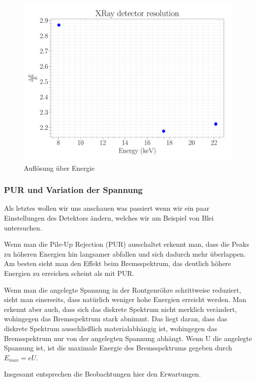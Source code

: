 \documentclass[a4paper,14pt]{article}
\begin{document}
\begin{figure}[H]
\centering
\includegraphics[width=\textwidth]{../Figures/xray_resolution.pdf}
\caption{Auflösung über Energie}
\label{XRay_resolution}
\end{figure}

\subsubsection{PUR und Variation der Spannung}
Als letztes wollen wir uns anschauen was passiert wenn wir ein paar Einstellungen des Detektors ändern, welches wir am Beispiel von Blei untersuchen.

Wenn man die Pile-Up Rejection (PUR) ausschaltet erkennt man, dass die Peaks zu höheren Energien hin langsamer abfallen und sich dadurch mehr überlappen. Am besten sieht man den Effekt beim Bremsspektrum, das deutlich höhere Energien zu erreichen scheint als mit PUR.

Wenn man die angelegte Spannung in der Rontgenröhre schrittweise reduziert, sieht man einerseits, dass natürlich weniger hohe Energien erreicht werden. Man erkennt aber auch, dass sich das diskrete Spektrum nicht merklich verändert, wohingegen das Bremsspektrum stark abnimmt. Das liegt daran, dass das diskrete Spektrum ausschließlich materialabhängig ist, wohingegen das Bremsspektrum nur von der angelegten Spannung abhängt. Wenn U die angelegte Spannung ist, ist die maximale Energie des Bremsspektrums gegeben durch $E_{max} = eU$.

Insgesamt entsprechen die Beobachtungen hier den Erwartungen.
\end{document}
